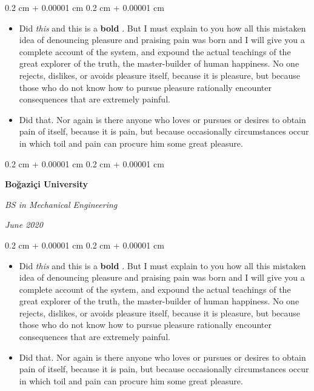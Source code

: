 \documentclass[10pt, letterpaper]{article}
\newenvironment{highlights}{
    \begin{itemize}[
        topsep=0.10 cm,
        parsep=0.10 cm,
        partopsep=0pt,
        itemsep=0pt,
        leftmargin=0.4 cm + 10pt
    ]
}{
    \end{itemize}
} %
\newenvironment{onecolentry}{
    \begin{adjustwidth}{
        0.2 cm + 0.00001 cm
    }{
        0.2 cm + 0.00001 cm
    }
}{
    \end{adjustwidth}
} %
\newenvironment{twocolentry}[2][]{
    \onecolentry
    \def\secondColumn{#2}
    \setcolumnwidth{\fill, 4.5 cm}
    \begin{paracol}{2}
}{
    \switchcolumn \raggedleft \secondColumn
    \end{paracol}
    \endonecolentry
} %
\let\hrefWithoutArrow\href
\renewcommand{\href}[2]{\hrefWithoutArrow{#1}{\mbox{\ifthenelse{\equal{#2}{}}{ }{#2 }\raisebox{.15ex}{\footnotesize \faExternalLink*}}}}
\begin{document}
        \vspace{0.10 cm-3px}
        \begin{onecolentry}
            \begin{highlights}
                \item Did \textit{this} and this is a \textbf{bold} \href{https://example.com}{link}. But I must explain to you how all this mistaken idea of denouncing pleasure and praising pain was born and I will give you a complete account of the system, and expound the actual teachings of the great explorer of the truth, the master-builder of human happiness. No one rejects, dislikes, or avoids pleasure itself, because it is pleasure, but because those who do not know how to pursue pleasure rationally encounter consequences that are extremely painful.
                \item Did that. Nor again is there anyone who loves or pursues or desires to obtain pain of itself, because it is pain, but because occasionally circumstances occur in which toil and pain can procure him some great pleasure.
            \end{highlights}
        \end{onecolentry}


        \vspace{0.2 cm-3px}

        \begin{twocolentry}{
            
            
        \textit{June 2020}}
            \textbf{Boğaziçi University}

            \textit{BS in Mechanical Engineering}
        \end{twocolentry}

        \vspace{0.10 cm-3px}
        \begin{onecolentry}
            \begin{highlights}
                \item Did \textit{this} and this is a \textbf{bold} \href{https://example.com}{link}. But I must explain to you how all this mistaken idea of denouncing pleasure and praising pain was born and I will give you a complete account of the system, and expound the actual teachings of the great explorer of the truth, the master-builder of human happiness. No one rejects, dislikes, or avoids pleasure itself, because it is pleasure, but because those who do not know how to pursue pleasure rationally encounter consequences that are extremely painful.
                \item Did that. Nor again is there anyone who loves or pursues or desires to obtain pain of itself, because it is pain, but because occasionally circumstances occur in which toil and pain can procure him some great pleasure.
            \end{highlights}
        \end{onecolentry}
\end{document}
